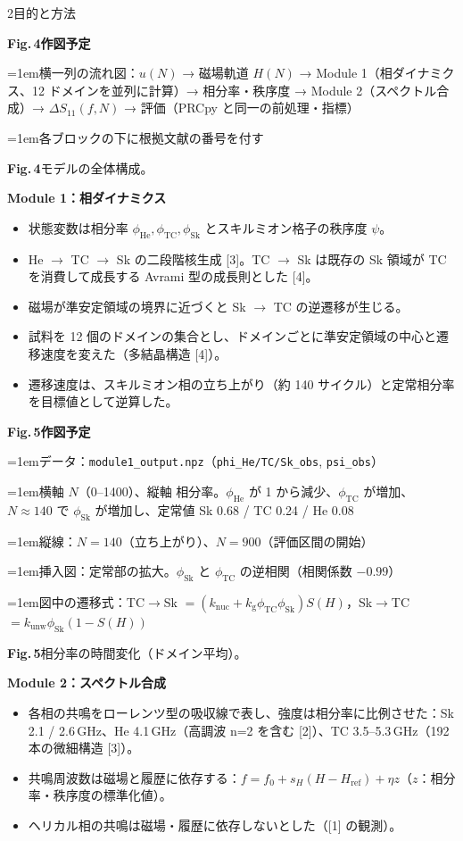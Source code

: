 \documentclass{article}
\newif\iffignotes \fignotestrue
\newcommand\capfont{\fontsize{16}{22.5}\selectfont}
\newcommand\notefont{\fontsize{12.5}{17.5}\selectfont}
\newcommand\subheadfont{\fontsize{24}{30}\selectfont\bfseries}
\newcommand\emk[1]{\textbf{#1}}
\newcommand\nitem{\par\hangindent=1em\hangafter=1\makebox[1em][l]{\textbullet}}
\newcommand\ssec[1]{\par\vspace{4mm}{\subheadfont\color{cMain}#1}\par
  \vspace{-3mm}{\color{cMain!35}\rule[2mm]{\linewidth}{0.8pt}}\par\vspace{-3mm}}
\newenvironment{txtfig}[1][0.60]
  {\def\tfw{#1}\par\begin{minipage}[t]{\tfw\linewidth}\vspace{0pt}}
  {\end{minipage}}
\newcommand\figside{\end{minipage}\hfill\begin{minipage}[t]{\dimexpr0.97\linewidth-\tfw\linewidth}\vspace{0pt}}
\newcommand{\figph}[4]{%
  \begin{tcolorbox}[enhanced, frame hidden, colback=cGray!7,
    borderline={1.8pt}{0pt}{cGray!70,dashed}, arc=2mm, height from=#1 to 1000mm,
    left=5mm,right=5mm,top=4mm,bottom=4mm]
    {\fontsize{19}{24}\selectfont\bfseries\color{cGray}#2\quad\fontsize{14}{18}\selectfont 作図予定}\par\vspace{1.5mm}
    \iffignotes{\notefont\color{black!75}#3\par}\fi
  \end{tcolorbox}\par\vspace{2mm}
  {\capfont\textbf{#2}\enspace #4\par}}
\newlength\gap   \setlength\gap{11mm}
\newlength\halfw \setlength\halfw{\dimexpr(\textwidth-\gap)/2\relax}
\begin{document}
\begin{minipage}[t]{\halfw}
\begin{secbox}{2\enspace 目的と方法}
\ssec{2.3\enspace モデル}
\figph{40mm}{Fig.\,4}{%
\nitem 横一列の流れ図：$u(N)$ → 磁場軌道 $H(N)$ → Module 1（相ダイナミクス、12 ドメインを並列に計算）→ 相分率・秩序度 → Module 2（スペクトル合成）→ $\Delta S_{11}(f,N)$ → 評価（PRCpy と同一の前処理・指標）
\nitem 各ブロックの下に根拠文献の番号を付す
}{モデルの全体構成。}
\vspace{2mm}
\begin{txtfig}
\emk{Module 1：相ダイナミクス}
\begin{itemize}
  \item 状態変数は相分率 $\phi_\mathrm{He}, \phi_\mathrm{TC}, \phi_\mathrm{Sk}$ とスキルミオン格子の秩序度 $\psi$。
  \item He $\to$ TC $\to$ Sk の二段階核生成 [3]。TC $\to$ Sk は既存の Sk 領域が TC を消費して成長する Avrami 型の成長則とした [4]。
  \item 磁場が準安定領域の境界に近づくと Sk $\to$ TC の逆遷移が生じる。
  \item 試料を 12 個のドメインの集合とし、ドメインごとに準安定領域の中心と遷移速度を変えた（多結晶構造 [4]）。
  \item 遷移速度は、スキルミオン相の立ち上がり（約 140 サイクル）と定常相分率を目標値として逆算した。
\end{itemize}
\figside
\figph{98mm}{Fig.\,5}{%
\nitem データ：\texttt{module1\_output.npz}（\texttt{phi\_He/TC/Sk\_obs}, \texttt{psi\_obs}）
\nitem 横軸 $N$（0–1400）、縦軸 相分率。$\phi_\mathrm{He}$ が 1 から減少、$\phi_\mathrm{TC}$ が増加、$N\approx140$ で $\phi_\mathrm{Sk}$ が増加し、定常値 Sk 0.68 / TC 0.24 / He 0.08
\nitem 縦線：$N=140$（立ち上がり）、$N=900$（評価区間の開始）
\nitem 挿入図：定常部の拡大。$\phi_\mathrm{Sk}$ と $\phi_\mathrm{TC}$ の逆相関（相関係数 $-0.99$）
\nitem 図中の遷移式：TC$\to$Sk $=(k_\mathrm{nuc}+k_\mathrm{g}\phi_\mathrm{TC}\phi_\mathrm{Sk})S(H)$，Sk$\to$TC $=k_\mathrm{unw}\phi_\mathrm{Sk}(1-S(H))$
}{相分率の時間変化（ドメイン平均）。}
\end{txtfig}
\vspace{3mm}
\begin{txtfig}
\emk{Module 2：スペクトル合成}
\begin{itemize}
  \item 各相の共鳴をローレンツ型の吸収線で表し、強度は相分率に比例させた：Sk 2.1 / 2.6\,GHz、He 4.1\,GHz（高調波 n=2 を含む [2]）、TC 3.5–5.3\,GHz（192 本の微細構造 [3]）。
  \item 共鳴周波数は磁場と履歴に依存する：$f = f_0 + s_H(H-H_\mathrm{ref}) + \eta z$（$z$：相分率・秩序度の標準化値）。
  \item ヘリカル相の共鳴は磁場・履歴に依存しないとした（[1] の観測）。

\end{itemize}
\end{txtfig}
\end{secbox}
\end{minipage}
\end{document}
